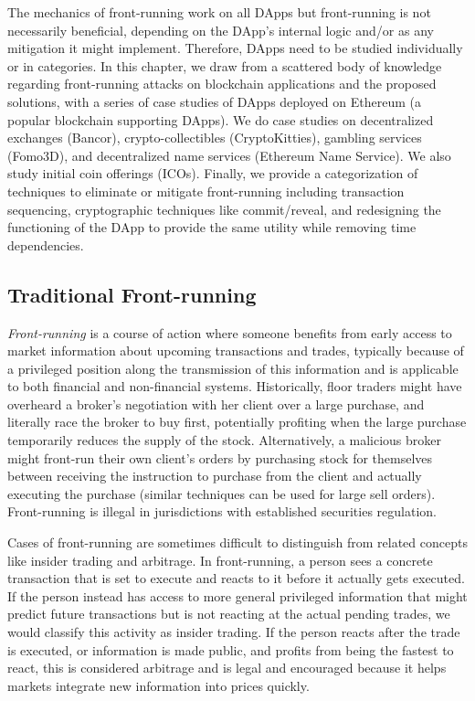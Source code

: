 The mechanics of front-running work on all DApps but front-running is not necessarily beneficial, depending on the DApp's internal logic and/or as any mitigation it might implement. Therefore, DApps need to be studied individually or in categories. In this chapter, we draw from a scattered body of knowledge regarding front-running attacks on blockchain applications and the proposed solutions, with a series of case studies of DApps deployed on Ethereum (a popular blockchain supporting DApps). We do case studies on decentralized exchanges (\eg Bancor), crypto-collectibles (\eg CryptoKitties), gambling services (\eg Fomo3D), and decentralized name services (\eg Ethereum Name Service). We also study initial coin offerings (ICOs). Finally, we provide a categorization of techniques to eliminate or mitigate front-running including transaction sequencing, cryptographic techniques like commit/reveal, and redesigning the functioning of the DApp to provide the same utility while removing time dependencies.




\subsection{Traditional Front-running}
\label{sec:What is front-running?}

\emph{Front-running} is a course of action where someone benefits from early access to market information about upcoming transactions and trades, typically because of a privileged position along the transmission of this information and is applicable to both financial and non-financial systems. Historically, floor traders might have overheard a broker's negotiation with her client over a large purchase, and literally race the broker to buy first, potentially profiting when the large purchase temporarily reduces the supply of the stock. Alternatively, a malicious broker might front-run their own client's orders by purchasing stock for themselves between receiving the instruction to purchase from the client and actually executing the purchase (similar techniques can be used for large sell orders). Front-running is illegal in jurisdictions with established securities regulation.

Cases of front-running are sometimes difficult to distinguish from related concepts like insider trading and arbitrage. In front-running, a person sees a concrete transaction that is set to execute and reacts to it before it actually gets executed. If the person instead has access to more general privileged information that might predict future transactions but is not reacting at the actual pending trades, we would classify this activity as insider trading. If the person reacts after the trade is executed, or information is made public, and profits from being the fastest to react, this is considered arbitrage and is legal and encouraged because it helps markets integrate new information into prices quickly.

